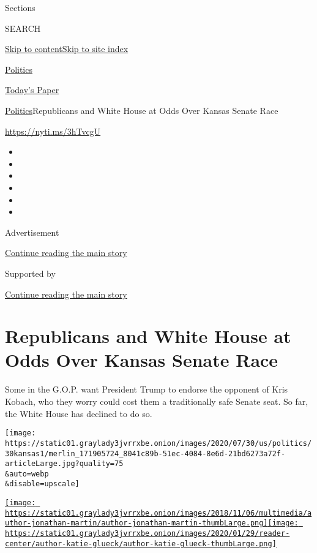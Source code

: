 Sections

SEARCH

\protect\hyperlink{site-content}{Skip to
content}\protect\hyperlink{site-index}{Skip to site index}

\href{https://www.nytimes3xbfgragh.onion/section/politics}{Politics}

\href{https://myaccount.nytimes3xbfgragh.onion/auth/login?response_type=cookie\&client_id=vi}{}

\href{https://www.nytimes3xbfgragh.onion/section/todayspaper}{Today's
Paper}

\href{/section/politics}{Politics}\textbar{}Republicans and White House
at Odds Over Kansas Senate Race

\url{https://nyti.ms/3hTvcgU}

\begin{itemize}
\item
\item
\item
\item
\item
\item
\end{itemize}

Advertisement

\protect\hyperlink{after-top}{Continue reading the main story}

Supported by

\protect\hyperlink{after-sponsor}{Continue reading the main story}

\hypertarget{republicans-and-white-house-at-odds-over-kansas-senate-race}{%
\section{Republicans and White House at Odds Over Kansas Senate
Race}\label{republicans-and-white-house-at-odds-over-kansas-senate-race}}

Some in the G.O.P. want President Trump to endorse the opponent of Kris
Kobach, who they worry could cost them a traditionally safe Senate seat.
So far, the White House has declined to do so.

\texttt{[image: https://static01.graylady3jvrrxbe.onion/images/2020/07/30/us/politics/30kansas1/merlin\_171905724\_8041c89b-51ec-4084-8e6d-21bd6273a72f-articleLarge.jpg?quality=75\\\&auto=webp\\\&disable=upscale]}

\href{https://www.nytimes3xbfgragh.onion/by/jonathan-martin}{\texttt{[image: https://static01.graylady3jvrrxbe.onion/images/2018/11/06/multimedia/author-jonathan-martin/author-jonathan-martin-thumbLarge.png]}}\href{https://www.nytimes3xbfgragh.onion/by/katie-glueck}{\texttt{[image: https://static01.graylady3jvrrxbe.onion/images/2020/01/29/reader-center/author-katie-glueck/author-katie-glueck-thumbLarge.png]}}


